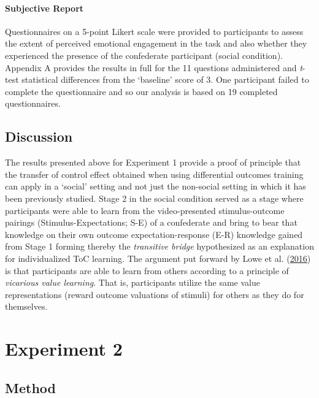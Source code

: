 \documentclass[]{elsarticle} %
\begin{document}
\hypertarget{subjective-report}{%
\paragraph{Subjective Report}\label{subjective-report}}

Questionnaires on a 5-point Likert scale were provided to participants
to assess the extent of perceived emotional engagement in the task and
also whether they experienced the presence of the confederate
participant (social condition). Appendix A provides the results in full
for the 11 questions administered and \emph{t}-test statistical
differences from the `baseline' score of 3. One participant failed to
complete the questionnaire and so our analysis is based on 19 completed
questionnaires.

\hypertarget{discussion}{%
\subsection{Discussion}\label{discussion}}

The results presented above for Experiment 1 provide a proof of
principle that the transfer of control effect obtained when using
differential outcomes training can apply in a `social' setting and not
just the non-social setting in which it has been previously studied.
Stage 2 in the social condition served as a stage where participants
were able to learn from the video-presented stimulus-outcome pairings
(Stimulus-Expectations; S-E) of a confederate and bring to bear that
knowledge on their own outcome expectation-response (E-R) knowledge
gained from Stage 1 forming thereby the \emph{transitive bridge}
hypothesized as an explanation for individualized ToC learning. The
argument put forward by Lowe et al.
(\protect\hyperlink{ref-lowe2016minimalist}{2016}) is that participants
are able to learn from others according to a principle of
\emph{vicarious value learning}. That is, participants utilize the same
value representations (reward outcome valuations of stimuli) for others
as they do for themselves.

\hypertarget{experiment-2}{%
\section{Experiment 2}\label{experiment-2}}

\hypertarget{method-1}{%
\subsection{Method}\label{method-1}}
\end{document}

